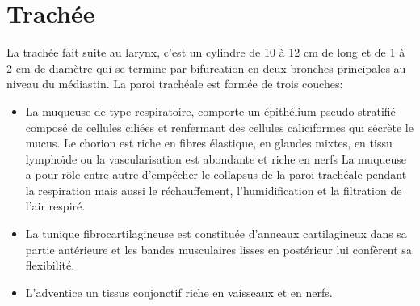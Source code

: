 
\chapter{Trachée} %


\label{ch:01-01} %



La trachée fait suite au larynx, c’est un cylindre de 10 à 12 cm de long et de 1 à 2 cm de diamètre qui se termine par bifurcation en deux bronches principales au niveau du médiastin. La paroi trachéale est formée de trois couches: 
\\
\begin{itemize}
\item La muqueuse de type respiratoire, comporte un épithélium pseudo stratifié composé de cellules ciliées et renfermant des cellules caliciformes qui sécrète le mucus. Le chorion est riche en fibres élastique, en glandes mixtes, en tissu lymphoïde ou la vascularisation est abondante et riche en nerfs La muqueuse a pour rôle entre autre d’empêcher le collapsus de la paroi trachéale pendant la respiration mais aussi le réchauffement, l’humidification et la filtration de l’air respiré.\\
\item La tunique fibrocartilagineuse est constituée d’anneaux cartilagineux dans sa partie antérieure et les bandes musculaires lisses en postérieur lui confèrent sa flexibilité.\\
\item L’adventice un tissus conjonctif riche en vaisseaux et en nerfs.\\
\end{itemize}

